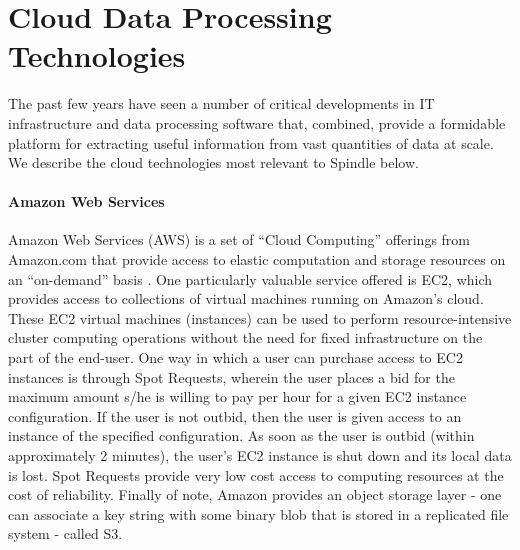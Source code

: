 \documentclass{thesis}
\begin{document}
    \section{Cloud Data Processing Technologies}
        The past few years have seen a number of critical developments in IT
        infrastructure and data processing software that, combined, provide
        a formidable platform for extracting useful information from vast
        quantities of data at scale. We describe the cloud technologies most
        relevant to Spindle below.

        \paragraph{Amazon Web Services}%
            Amazon Web Services (AWS) is a set of ``Cloud Computing'' offerings
            from Amazon.com that provide access to elastic computation and storage
            resources on an ``on-demand'' basis \cite{aws}. One particularly valuable
            service offered is EC2, which provides access to collections of virtual
            machines running on Amazon's cloud. These EC2 virtual machines (instances)
            can be used to perform resource-intensive cluster computing operations without
            the need for fixed infrastructure on the part of the end-user. One way in which
            a user can purchase access to EC2 instances is through Spot Requests, wherein the
            user places a bid for the maximum amount s/he is willing to pay per hour for a given
            EC2 instance configuration. If the user is not outbid, then the user is given access
            to an instance of the specified configuration. As soon as the user is outbid (within
            approximately 2 minutes), the user's EC2 instance is shut down and its local data is
            lost. Spot Requests provide very low cost access to computing resources at the cost of
            reliability.%
            Finally of note, Amazon provides an object storage layer - one can associate a key string
            with some binary blob that is stored in a replicated file system - called S3.
\end{document}
